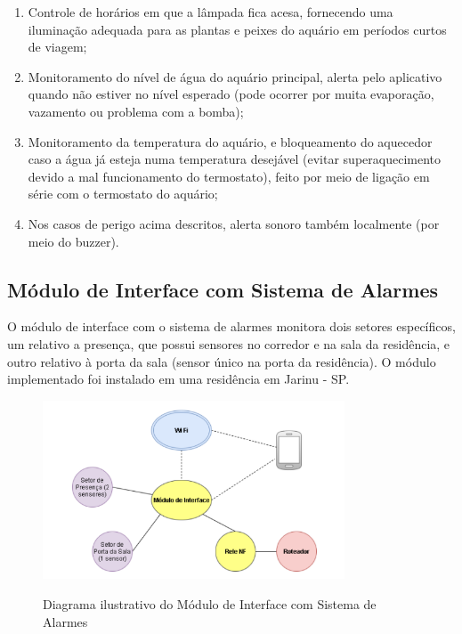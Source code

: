 \begin{enumerate}
	\item Controle de horários em que a lâmpada fica acesa, fornecendo uma iluminação adequada para as plantas e peixes do aquário em períodos curtos de viagem;
	\item Monitoramento do nível de água do aquário principal, alerta pelo aplicativo quando não estiver no nível esperado (pode ocorrer por muita evaporação, vazamento ou problema com a bomba);
	\item Monitoramento da temperatura do aquário, e bloqueamento do aquecedor caso a água já esteja numa temperatura desejável (evitar superaquecimento devido a mal funcionamento do termostato), feito por meio de ligação em série com o termostato do aquário;
	\item Nos casos de perigo acima descritos, alerta sonoro também localmente (por meio do buzzer).

\end{enumerate}

\subsection{Módulo de Interface com Sistema de Alarmes}

O módulo de interface com o sistema de alarmes monitora dois setores específicos, um relativo a presença, que possui sensores no corredor e na sala da residência, e outro relativo à porta da sala (sensor único na porta da residência). O módulo implementado foi instalado em uma residência em Jarinu - SP.

\begin{figure}[H]
	\centering
	\caption{Diagrama ilustrativo do Módulo de Interface com Sistema de Alarmes}
	\includegraphics[width=0.8\textwidth]{diagramaAlarme}
	\label{fig:diagramaAlarme}
\end{figure}

